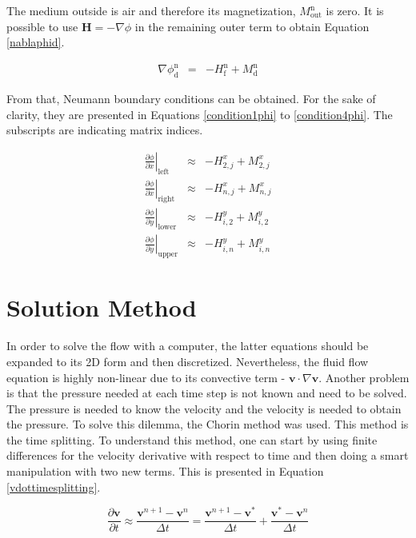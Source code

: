 \documentclass[journal]{IEEEtran}
\begin{document}
The medium outside is air and therefore its magnetization, $M_{\mathrm{out}}^{\mathrm{n}}$ is zero. It is possible to use $\mathbf{H} = -\nabla \phi$ in the remaining outer term to obtain Equation \ref{nablaphid}.

\begin{eqnarray}
\nabla\phi_{\mathrm{d}}^{\mathrm{n}} & = & -H_{\mathrm{f}}^{\mathrm{n}} + M_{\mathrm{d}}^{\mathrm{n}} \label{nablaphid}
\end{eqnarray}

From that, Neumann boundary conditions can be obtained. For the sake of clarity, they are presented in Equations \ref{condition1phi} to \ref{condition4phi}. The subscripts are indicating matrix indices.

\begin{eqnarray}
\left.\frac{\partial \phi}{\partial x}\right|_{\mathrm{left}}\;\;&\approx&- H^{x}_{2,j} + M^{x}_{2,j}\label{condition1phi}\\
\left.\frac{\partial \phi}{\partial x}\right|_{\mathrm{right}}&\approx&- H^{x}_{n,j} + M^{x}_{n,j}\\
\left.\frac{\partial \phi}{\partial y}\right|_{\mathrm{lower}}&\approx&- H^{y}_{i,2} + M^{y}_{i,2}\\
\left.\frac{\partial \phi}{\partial y}\right|_{\mathrm{upper}}&\approx&- H^{y}_{i,n} + M^{y}_{i,n}\label{condition4phi}
\end{eqnarray}

\section{Solution Method}
In order to solve the flow with a computer, the latter equations should be expanded to its 2D form and then discretized. Nevertheless, the fluid flow equation is highly non-linear due to its convective term - $\mathbf{v}\cdot \nabla \mathbf{v}$. Another problem is that the pressure needed at each time step is not known and need to be solved. The pressure is needed to know the velocity and the velocity is needed to obtain the pressure. To solve this dilemma, the Chorin method \cite{Chorin1997118} was used. This method is the time splitting. To understand this method, one can start by using finite differences for the velocity derivative with respect to time and then doing a smart manipulation with two new terms. This is presented in Equation \ref{vdottimesplitting}.

\begin{equation}
\frac{\partial \textbf{v}}{\partial t}\approx \frac{\textbf{v}^{n+1}-\textbf{v}^n}{\Delta t}=\frac{\textbf{v}^{n+1}-\textbf{v}^*}{\Delta t}+\frac{\textbf{v}^{*}-\textbf{v}^n}{\Delta t} \label{vdottimesplitting}
\end{equation}
\end{document}
